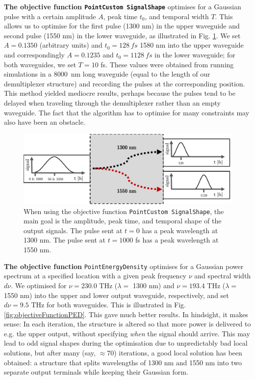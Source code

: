\textbf{The objective function \texttt{PointCustom SignalShape}} optimises for a Gaussian pulse with a certain amplitude $A$, peak time $t_0$, and temporal width $T$. This allows us to optimise for the first pulse (1300 nm) in the upper waveguide and second pulse (1550 nm) in the lower waveguide, as illustrated in Fig. \ref{fig:objectiveFunctionGaussian}. We set $A=0.1350$ (arbitrary units) and $t_0=\SI{128}{fs}$ 1580 nm into the upper waveguide and correspondingly $A=0.1235$ and $t_0 = \SI{1128}{fs}$ in the lower waveguide; for both waveguides, we set $T = 10$ fs. These values were obtained from running simulations in a \SI{8000}{nm} long waveguide (equal to the length of our demultiplexer structure) and recording the pulses at the corresponding position. This method yielded mediocre results, perhaps because the pulses tend to be delayed when traveling through the demultiplexer rather than an empty waveguide. The fact that the algorithm has to optimise for many constraints may also have been an obstacle. \\

\begin{figure}[h!]
    \centering
    \includegraphics[width=1.0\textwidth]
    {fig/design/objectivefunctionsgaussian.pdf}
    \caption{When using the objective function \texttt{PointCustom SignalShape}, the main goal is the amplitude, peak time, and temporal shape of the output signals. The pulse sent at $t=0$ has a peak wavelength at 1300 nm. The pulse sent at $t= 1000$ fs has a peak wavelength at 1550 nm.}
    \label{fig:objectiveFunctionGaussian}
\end{figure}

\vspace{1cm}

\textbf{The objective function} \texttt{PointEnergyDensity}
optimises for a Gaussian power spectrum at a specified location with a given peak frequency $\nu$ and spectral width $d\nu$. We optimised for $\nu = 230.0$ THz ($\lambda =$ 1300 nm) and $ \nu= 193.4$ THz ($\lambda =$ 1550 nm) into the upper and lower output waveguide, respectively, and set $d\nu = 9.5$ THz for both waveguides. This is illustrated in Fig. \ref{fig:objectiveFunctionPED}.
This gave much better results. In hindsight, it makes sense: In each iteration, the structure is altered so that more power is delivered to e.g. the upper output, without specifying \textit{when} the signal should arrive. This may lead to odd signal shapes during the optimisation due to unpredictably bad local solutions, but after many (say, $\approx 70$) iterations, a good local solution has been obtained: a structure that splits wavelengths of 1300 nm and 1550 nm into two separate output terminals while keeping their Gaussian form.
 
